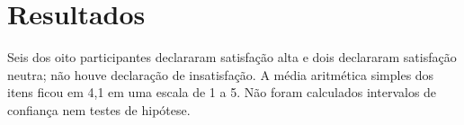 \section{Resultados}
Seis dos oito participantes declararam satisfação alta e dois declararam satisfação neutra; não houve declaração de insatisfação.
A média aritmética simples dos itens ficou em 4,1 em uma escala de 1 a 5.
Não foram calculados intervalos de confiança nem testes de hipótese.
